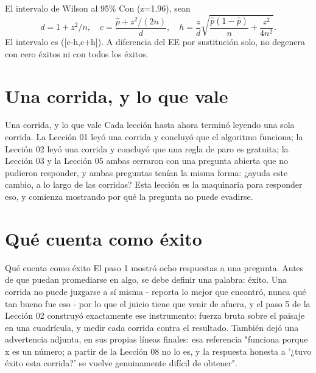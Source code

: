 \begin{frame}{El intervalo de Wilson al 95\%}
Con (z=1.96), sean
\[
d=1+z^2/n,\quad c=\frac{\hat p+z^2/(2n)}d,\quad
h=\frac z d\sqrt{\frac{\hat p(1-\hat p)}n+\frac{z^2}{4n^2}}.
\]
El intervalo es ([c-h,c+h]). A diferencia del EE por sustitución solo,
no degenera con cero éxitos ni con todos los éxitos.
\end{frame}

\section{Una corrida, y lo que vale}

\begin{frame}{Una corrida, y lo que vale}
Cada lección hasta ahora terminó leyendo una sola corrida. La Lección 01 leyó
una corrida y concluyó que el algoritmo funciona; la Lección 02 leyó una corrida
y concluyó que una regla de paro es gratuita; la Lección 03 y la Lección 05
ambas cerraron con una pregunta abierta que no pudieron responder, y ambas
preguntas tenían la misma forma: ¿ayuda este cambio, a lo largo de las corridas?
Esta lección es la maquinaria para responder eso, y comienza mostrando por qué
la pregunta no puede evadirse.
\end{frame}


\section{Qué cuenta como éxito}

\begin{frame}{Qué cuenta como éxito}
El paso 1 mostró ocho respuestas a una pregunta. Antes de que puedan promediarse
en algo, se debe definir una palabra: éxito. Una corrida no puede juzgarse a sí misma -
reporta lo mejor que encontró, nunca qué tan bueno fue eso - por lo que el juicio
tiene que venir de afuera, y el paso 5 de la Lección 02 construyó exactamente
ese instrumento: fuerza bruta sobre el paisaje en una cuadrícula, y medir cada corrida
contra el resultado. También dejó una advertencia adjunta, en sus propias líneas finales:
esa referencia "funciona porque x es un número; a partir de la Lección 08 no lo es,
y la respuesta honesta a '¿tuvo éxito esta corrida?' se vuelve genuinamente difícil de obtener".
\end{frame}

